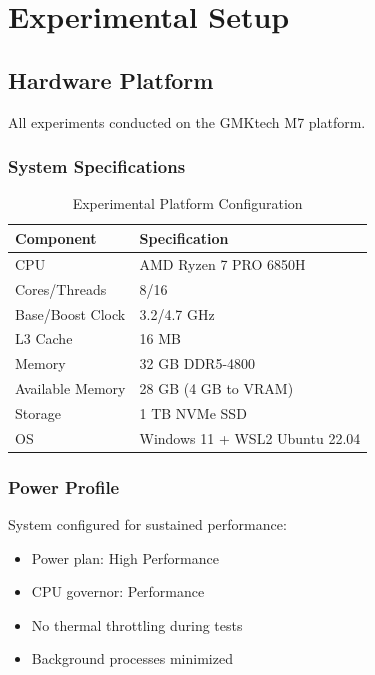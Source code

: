 \section{Experimental Setup}
\label{sec:experimental}

\subsection{Hardware Platform}

All experiments conducted on the GMKtech M7 platform.

\subsubsection{System Specifications}

\begin{table}[h]
\centering
\caption{Experimental Platform Configuration}
\label{tab:experimental_platform}
\begin{tabular}{ll}
\toprule
\textbf{Component} & \textbf{Specification} \\
\midrule
CPU & AMD Ryzen 7 PRO 6850H \\
Cores/Threads & 8/16 \\
Base/Boost Clock & 3.2/4.7 GHz \\
L3 Cache & 16 MB \\
Memory & 32 GB DDR5-4800 \\
Available Memory & 28 GB (4 GB to VRAM) \\
Storage & 1 TB NVMe SSD \\
OS & Windows 11 + WSL2 Ubuntu 22.04 \\
\bottomrule
\end{tabular}
\end{table}

\subsubsection{Power Profile}

System configured for sustained performance:

\begin{itemize}
    \item Power plan: High Performance
    \item CPU governor: Performance
    \item No thermal throttling during tests
    \item Background processes minimized
\end{itemize}

